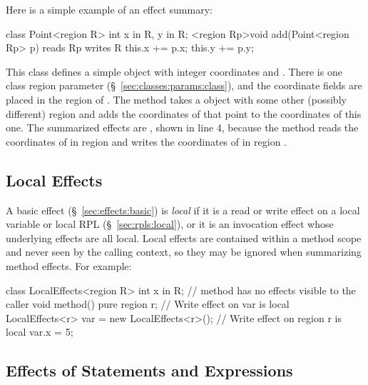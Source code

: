 Here is a simple example of an effect summary:
%
\begin{numbereddpjlisting}
class Point<region R> {
  int x in R, y in R;
  <region Rp>void add(Point<region Rp> p) 
    reads Rp 
    writes R 
  {
    this.x += p.x;
    this.y += p.y;
  }
}
\end{numbereddpjlisting}
%
This class defines a simple  object with integer
coordinates  and .  There is one class region parameter
 (\S~\ref{sec:classes:params:class}), and the coordinate fields
are placed in the region of .  The  method takes a
 object with some other (possibly different) region
 and adds the coordinates of that point to the coordinates of
this one.  The summarized effects are , shown
in line 4, because the method reads the coordinates of  in
region  and writes the coordinates of  in region
.

\subsection{Local Effects%
\label{sec:effects:local}}

A basic effect (\S~\ref{sec:effects:basic}) is \emph{local} if it is a
read or write effect on a local variable or local RPL
(\S~\ref{sec:rpls:local}), or it is an invocation effect whose
underlying effects are all local.  Local effects are contained within
a method scope and never seen by the calling context, so they may be
ignored when summarizing method effects.  For example:
%
\begin{dpjlisting}
class LocalEffects<region R> {
  int x in R;
  // method has no effects visible to the caller
  void method() 
    pure 
  {
    region r;
    // Write effect on var is local
    LocalEffects<r> var = new LocalEffects<r>();
    // Write effect on region r is local
    var.x = 5;
  }
}
\end{dpjlisting}

\subsection{Effects of Statements and Expressions%
\label{sec:effects:stmt-exp}}

